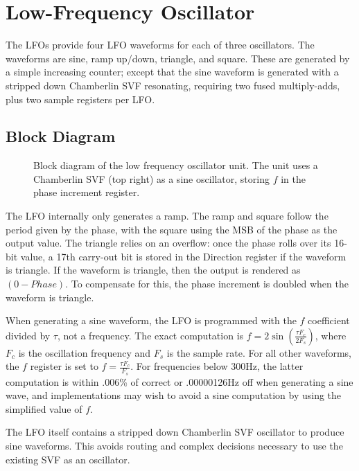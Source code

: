 
\chapter{Low-Frequency Oscillator}

The LFOs provide four LFO waveforms for each of three oscillators.  The waveforms are sine, ramp up/down, triangle, and square.  These are generated by a simple increasing counter; except that the sine waveform is generated with a stripped down Chamberlin SVF resonating, requiring two fused multiply-adds, plus two sample registers per LFO.

\section{Block Diagram}

\begin{figure}[h!t]
    \centering
    
    \caption{\label{fig:lfo-block-diagram} Block diagram of the low frequency oscillator unit.  The unit uses a Chamberlin SVF (top right) as a sine oscillator, storing $f$ in the phase increment register.}
\end{figure}

The LFO internally only generates a ramp.  The ramp and square follow the period given by the phase, with the square using the MSB of the phase as the output value.  The triangle relies on an overflow:  once the phase rolls over its 16-bit value, a 17th carry-out bit is stored in the Direction register if the waveform is triangle.  If the waveform is triangle, then the output is rendered as $(0-Phase)$.  To compensate for this, the phase increment is doubled when the waveform is triangle.

When generating a sine waveform, the LFO is programmed with the $f$ coefficient divided by $\tau$, not a frequency.  The exact computation is $f=2\sin\left(\frac{\tau F_c}{2F_s}\right)$, where $F_c$ is the oscillation frequency and $F_s$ is the sample rate.  For all other waveforms, the $f$ register is set to $f=\frac{\tau F_c}{F_s}$.  For frequencies below 300Hz, the latter computation is within .006\% of correct or .00000126Hz off when generating a sine wave, and implementations may wish to avoid a sine computation by using the simplified value of $f$.

The LFO itself contains a stripped down Chamberlin SVF oscillator to produce sine waveforms.  This avoids routing and complex decisions necessary to use the existing SVF as an oscillator.

